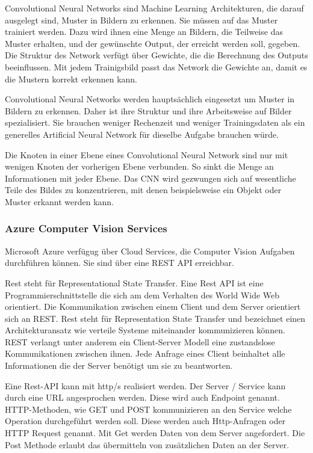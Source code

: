 Convolutional Neural Networks sind Machine Learning Architekturen, die darauf ausgelegt sind, Muster in Bildern zu erkennen. Sie müssen auf das Muster trainiert werden. Dazu wird ihnen eine Menge an Bildern, die Teilweise das Muster erhalten, und der gewünschte Output, der erreicht werden soll, gegeben. Die Struktur des Network verfügt über Gewichte, die die Berechnung des Outputs beeinflussen. Mit jedem Trainigsbild passt das Network die Gewichte an, damit es die Mustern korrekt erkennen kann.\citep{introToCNN,surveyOfDeepLearing}

Convolutional Neural Networks werden hauptsächlich eingesetzt um Muster in Bildern zu erkennen. Daher ist ihre Struktur und ihre Arbeitsweise auf Bilder spezialisiert. Sie brauchen weniger Rechenzeit und weniger Trainingsdaten als ein generelles Artificial Neural Network für dieselbe Aufgabe brauchen würde.\citep{introToCNN,surveyOfDeepLearing,cNNforClass} 

Die Knoten in einer Ebene eines Convolutional Neural Network sind nur mit wenigen Knoten der vorherigen Ebene verbunden. So sinkt die Menge an Informationen mit jeder Ebene. Das CNN wird gezwungen sich auf wesentliche Teile des Bildes zu konzentrieren, mit denen beispielsweise ein Objekt oder  Muster erkannt werden kann. \citep{introToCNN,surveyOfDeepLearing}

\subsubsection{Azure Computer Vision Services}

Microsoft Azure verfügug über Cloud Services, die Computer Vision Aufgaben durchführen können.
Sie sind über eine REST API erreichbar. 

Rest steht für Representational State Transfer. Eine Rest API ist eine Programmierschnittstelle die sich am dem Verhalten des World Wide Web orientiert. Die Kommunikation zwischen einem Client und dem Server orientiert sich an REST.
Rest steht für Representation State Transfer und bezeichnet einen Architekturansatz wie verteile Systeme miteinander kommunizieren können. REST verlangt unter anderem ein Client-Server Modell eine zustandslose Kommunikationen zwischen ihnen. Jede Anfrage eines Client beinhaltet alle Informationen die der Server benötigt um sie zu beantworten. %

Eine Rest-API kann mit http/s realisiert werden. Der Server / Service kann durch eine URL angesprochen werden. Diese wird auch Endpoint genannt. HTTP-Methoden, wie GET und POST kommunizieren an den Service welche Operation durchgeführt werden soll. Diese werden auch Http-Anfragen oder HTTP Request genannt. Mit Get werden Daten von dem Server angefordert. Die Post Methode erlaubt das übermitteln von zusätzlichen Daten an der Server.

